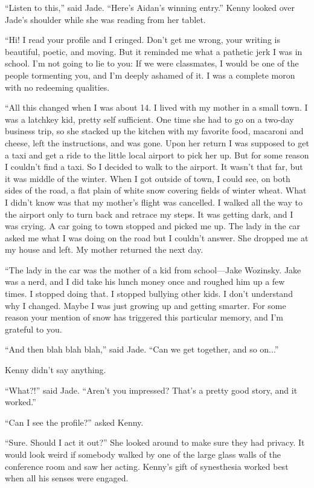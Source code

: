 \documentclass{memoir}
\begin{document}
``Listen to this,'' said Jade. ``Here's Aidan's winning entry.'' Kenny looked over Jade's shoulder while she was reading from her tablet.

``Hi! I read your profile and I cringed. Don't get me wrong, your writing is beautiful, poetic, and moving. But it reminded me what a pathetic jerk I was in school. I'm not going to lie to you: If we were classmates, I would be one of the people tormenting you, and I'm deeply ashamed of it. I was a complete moron with no redeeming qualities. 

``All this changed when I was about 14. I lived with my mother in a small town. I was a latchkey kid, pretty self sufficient. One time she had to go on a two-day business trip, so she stacked up the kitchen with my favorite food, macaroni and cheese, left the instructions, and was gone. Upon her return I was supposed to get a taxi and get a ride to the little local airport to pick her up. But for some reason I couldn't find a taxi. So I decided to walk to the airport. It wasn't that far, but it was middle of the winter. When I got outside of town, I could see, on both sides of the road, a flat plain of white snow covering fields of winter wheat. What I didn't know was that my mother's flight was cancelled. I walked all the way to the airport only to turn back and retrace my steps. It was getting dark, and I was crying. A car going to town stopped and picked me up. The lady in the car asked me what I was doing on the road but I couldn't answer. She dropped me at my house and left. My mother returned the next day. 

``The lady in the car was the mother of a kid from school---Jake Wozinsky. Jake was a nerd, and I did take his lunch money once and roughed him up a few times. I stopped doing that. I stopped bullying other kids. I don't understand why I changed. Maybe I was just growing up and getting smarter. For some reason your mention of snow has triggered this particular memory, and I'm grateful to you.

``And then blah blah blah,'' said Jade. ``Can we get together, and so on...'' 

Kenny didn't say anything. 

``What?!'' said Jade. ``Aren't you impressed? That's a pretty good story, and it worked.''

``Can I see the profile?'' asked Kenny.

``Sure. Should I act it out?'' She looked around to make sure they had privacy. It would look weird if somebody walked by one of the large glass walls of the conference room and saw her acting. Kenny's gift of synesthesia worked best when all his senses were engaged.
\end{document}
